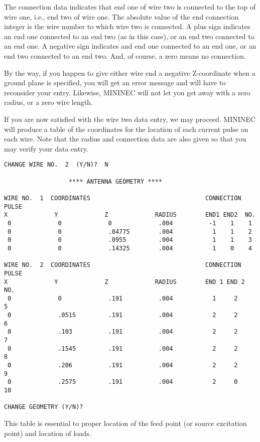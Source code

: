 \documentclass[12pt]{article}
\begin{document}
The connection data indicates that end one of wire two is connected to
the top of wire one, i.e., end two of wire one. The absolute value of
the end connection integer is the wire number to which wire two is
connected. A plus sign indicates an end one connected to an end two (as
in this case), or an end two connected to an end one. A negative sign
indicates and end one connected to an end one, or an end two connected
to an end two. And, of course, a zero means no connection.

By the way, if you happen to give either wire end a negative
Z-coordinate when a ground plane is specified, you will get an error
message and will have to reconsider your entry. Likewise, MININEC will
not let you get away with a zero radius, or a zero wire length.

If you are now satisfied with the wire two data entry, we may proceed.
MININEC will produce a table of the coordinates for the location of each
current pulse on each wire. Note that the radius and connection data are
also given so that you may verify your data entry.

\begin{Verbatim}
CHANGE WIRE NO.  2  (Y/N)?  N

                  **** ANTENNA GEOMETRY ****

WIRE NO.  1  COORDINATES                                CONNECTION PULSE
X             Y             Z             RADIUS        END1 END2  NO.
 0             0             0             .004          -1    1    1
 0             0             .04775        .004           1    1    2
 0             0             .0955         .004           1    1    3
 0             0             .14325        .004           1    0    4

WIRE NO.  2  COORDINATES                                CONNECTION   PULSE
X             Y             Z             RADIUS        END 1 END 2  NO.
 0             0             .191          .004           1     2      5
 0             .0515         .191          .004           2     2      6
 0             .103          .191          .004           2     2      7
 0             .1545         .191          .004           2     2      8
 0             .206          .191          .004           2     2      9
 0             .2575         .191          .004           2     0     10

CHANGE GEOMETRY (Y/N)?
\end{Verbatim}

This table is essential to proper location of the feed point (or source
excitation point) and location of loads.
\end{document}
